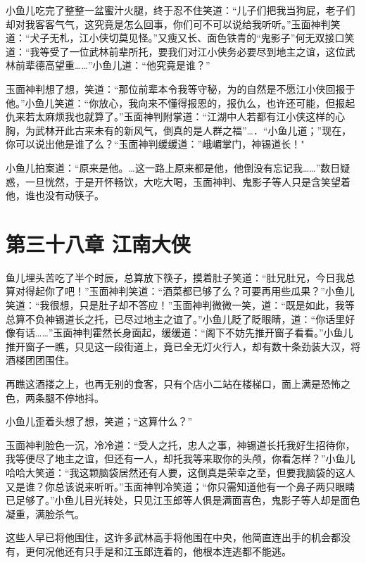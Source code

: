 \documentclass[12pt,oneside]{book}
\begin{document}
小鱼儿吃完了整整一盆蜜汁火腿，终于忍不住笑道：``儿子们把我当狗屁，老子们却对我客客气气，这究竟是怎么回事，你们可不可以说给我听听。''玉面神判笑道：``犬子无札，江小侠切莫见怪。''又瘦又长、面色铁青的``鬼影子''何无双接口笑道：``我等受了一位武林前辈所托，要我们对江小侠务必要尽到地主之谊，这位武林前辈德高望重\ldots\ldots{}''小鱼儿道：``他究竟是谁？''

玉面神判想了想，笑道：``那位前辈本令我等守秘，为的自然是不愿江小侠回报于他。''小鱼儿笑道：``你放心，我向来不懂得报恩的，报仇么，也许还可能，但报起仇来若太麻烦我也就算了。''玉面神判附掌道：``江湖中人若都有江小侠这样的心胸，为武林开此古来未有的新风气，倒真的是人群之福''\ldots．``小鱼儿道；''现在，你可以说出他是谁了么？``玉面神判缓缓道：''峨嵋掌门，神锡道长！"

小鱼儿拍案道：``原来是他。\ldots 这一路上原来都是他，他倒没有忘记我\ldots\ldots{}''数日疑惑，一旦恍然，于是开怀畅饮，大吃大喝，玉面神判、鬼影子等人只是含笑望着他，谁也没有动筷子。

\hypertarget{ux7b2cux4e09ux5341ux516bux7ae0-ux6c5fux5357ux5927ux4fa0}{%
\chapter{第三十八章
江南大侠}\label{ux7b2cux4e09ux5341ux516bux7ae0-ux6c5fux5357ux5927ux4fa0}}

鱼儿埋头苦吃了半个时辰，总算放下筷子，摸着肚子笑道：``肚兄肚兄，今日我总算对得起你了吧！''玉面神判笑道：``酒菜都已够了么？可要再用些瓜果？''小鱼儿笑道：``我很想，只是肚子却不答应！''玉面神判微微一笑，道：``既是如此，我等总算不负神锡道长之托，已尽过地主之谊了。''小鱼儿眨了眨眼睛，道：``你话里好像有话\ldots\ldots{}''玉面神判霍然长身面起，缓缓道：``阁下不妨先推开窗子看看。''小鱼儿推开窗子一瞧，只见这一段街道上，竟已全无灯火行人，却有数十条劲装大汉，将酒楼团团围住。

再瞧这酒搂之上，也再无别的食客，只有个店小二站在楼梯口，面上满是恐怖之色，两条腿不停地抖。

小鱼儿歪着头想了想，笑道；``这算什么？''

玉面神判脸色一沉，冷冷道：``受人之托，忠人之事，神锡道长托我好生招待你，我等便尽了地主之谊，但还有一人，却托我等来取你的头颅，你看怎样？''小鱼儿哈哈大笑道：``我这颗脑袋居然还有人要，这倒真是荣幸之至，但要我脑袋的这人又是谁？你总该说来听听。''玉面神判冷笑道；``你只需知道他有一个鼻子两只眼睛已足够了。''小鱼儿目光转处，只见江玉郎等人俱是满面喜色，鬼影子等人却是面色凝重，满脸杀气。

这些人早已将他围住，这许多武林高手将他围在中央，他简直连出手的机会都没有，更何况他还有只手是和江玉郎连着的，他根本连逃都不能逃。
\end{document}
